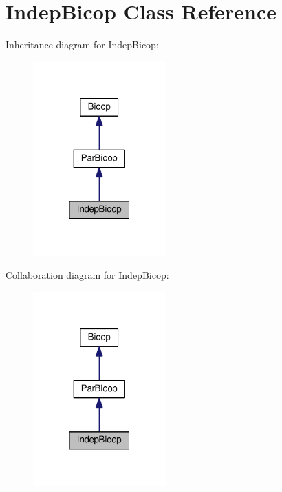 \hypertarget{class_indep_bicop}{}\section{Indep\+Bicop Class Reference}
\label{class_indep_bicop}


Inheritance diagram for Indep\+Bicop\+:\nopagebreak
\begin{figure}[H]
\begin{center}
\leavevmode
\includegraphics[width=145pt]{class_indep_bicop__inherit__graph}
\end{center}
\end{figure}


Collaboration diagram for Indep\+Bicop\+:\nopagebreak
\begin{figure}[H]
\begin{center}
\leavevmode
\includegraphics[width=145pt]{class_indep_bicop__coll__graph}
\end{center}
\end{figure}
